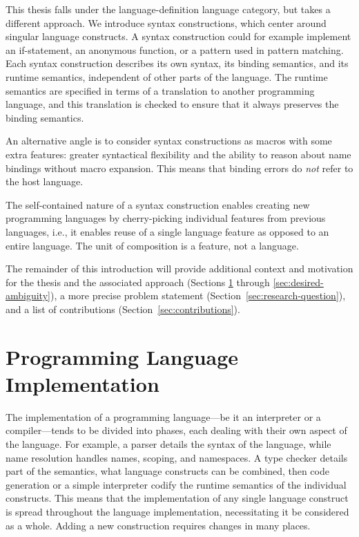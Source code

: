 \documentclass{kththesis}
\begin{document}

This thesis falls under the language-definition language category, but takes a different approach. We introduce syntax constructions, which center around singular language constructs. A syntax construction could for example implement an if-statement, an anonymous function, or a pattern used in pattern matching. Each syntax construction describes its own syntax, its binding semantics, and its runtime semantics, independent of other parts of the language. The runtime semantics are specified in terms of a translation to another programming language, and this translation is checked to ensure that it always preserves the binding semantics.

An alternative angle is to consider syntax constructions as macros with some extra features: greater syntactical flexibility and the ability to reason about name bindings without macro expansion. This means that binding errors do \emph{not} refer to the host language.

The self-contained nature of a syntax construction enables creating new programming languages by cherry-picking individual features from previous languages, i.e., it enables reuse of a single language feature as opposed to an entire language. The unit of composition is a feature, not a language.

The remainder of this introduction will provide additional context and motivation for the thesis and the associated approach (Sections \ref{sec:compiler-design} through \ref{sec:desired-ambiguity}), a more precise problem statement (Section~\ref{sec:research-question}), and a list of contributions (Section~\ref{sec:contributions}).

\section{Programming Language Implementation} \label{sec:compiler-design}

The implementation of a programming language---be it an interpreter or a compiler---tends to be divided into phases, each dealing with their own aspect of the language. For example, a parser details the syntax of the language, while name resolution handles names, scoping, and namespaces. A type checker details part of the semantics, what language constructs can be combined, then code generation or a simple interpreter codify the runtime semantics of the individual constructs. This means that the implementation of any single language construct is spread throughout the language implementation, necessitating it be considered as a whole. Adding a new construction requires changes in many places.
\end{document}
